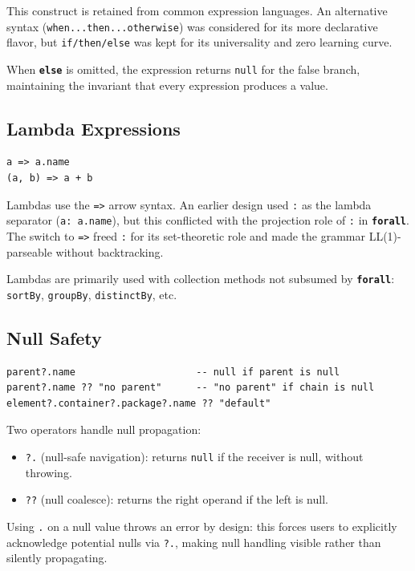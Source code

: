 \documentclass[11pt,a4paper]{article}
\newcommand{\kw}[1]{\texttt{\textbf{#1}}}
\begin{document}
This construct is retained from common expression languages. An alternative syntax (\texttt{when...then...otherwise}) was considered for its more declarative flavor, but \texttt{if/then/else} was kept for its universality and zero learning curve.

When \kw{else} is omitted, the expression returns \texttt{null} for the false branch, maintaining the invariant that every expression produces a value.


\subsection{Lambda Expressions}

\begin{lstlisting}[style=jjel,numbers=none]
a => a.name
(a, b) => a + b
\end{lstlisting}

Lambdas use the \texttt{=>} arrow syntax. An earlier design used \texttt{:} as the lambda separator (\texttt{a: a.name}), but this conflicted with the projection role of \texttt{:} in \kw{forall}. The switch to \texttt{=>} freed \texttt{:} for its set-theoretic role and made the grammar LL(1)-parseable without backtracking.

Lambdas are primarily used with collection methods not subsumed by \kw{forall}: \texttt{sortBy}, \texttt{groupBy}, \texttt{distinctBy}, etc.


\subsection{Null Safety}

\begin{lstlisting}[style=jjel,numbers=none]
parent?.name                     -- null if parent is null
parent?.name ?? "no parent"      -- "no parent" if chain is null
element?.container?.package?.name ?? "default"
\end{lstlisting}

Two operators handle null propagation:
\begin{itemize}
    \item \texttt{?.} (null-safe navigation): returns \texttt{null} if the receiver is null, without throwing.
    \item \texttt{??} (null coalesce): returns the right operand if the left is null.
\end{itemize}

Using \texttt{.} on a null value throws an error by design: this forces users to explicitly acknowledge potential nulls via \texttt{?.}, making null handling visible rather than silently propagating.
\end{document}
